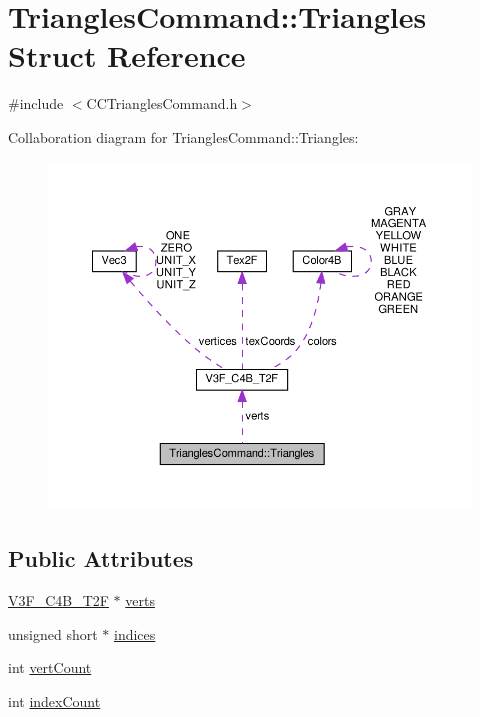 \hypertarget{structTrianglesCommand_1_1Triangles}{}\section{Triangles\+Command\+:\+:Triangles Struct Reference}
\label{structTrianglesCommand_1_1Triangles}


{\ttfamily \#include $<$C\+C\+Triangles\+Command.\+h$>$}



Collaboration diagram for Triangles\+Command\+:\+:Triangles\+:
\nopagebreak
\begin{figure}[H]
\begin{center}
\leavevmode
\includegraphics[width=350pt]{structTrianglesCommand_1_1Triangles__coll__graph}
\end{center}
\end{figure}
\subsection*{Public Attributes}
\begin{DoxyCompactItemize}
\item 
\hyperlink{structV3F__C4B__T2F}{V3\+F\+\_\+\+C4\+B\+\_\+\+T2F} $\ast$ \hyperlink{structTrianglesCommand_1_1Triangles_a38ec346029e58886359e2d598ed8bb07}{verts}
\item 
unsigned short $\ast$ \hyperlink{structTrianglesCommand_1_1Triangles_ad065ddf5e6bd98ee147eebf92beaf01b}{indices}
\item 
int \hyperlink{structTrianglesCommand_1_1Triangles_a5a593db118dfd14068fe735f212b939a}{vert\+Count}
\item 
int \hyperlink{structTrianglesCommand_1_1Triangles_a680c96d73c34f9738915f3904abb16d4}{index\+Count}
\end{DoxyCompactItemize}


